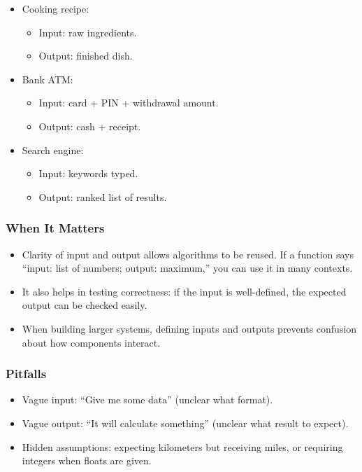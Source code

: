 \documentclass[
  letterpaper,
  DIV=11,
  numbers=noendperiod]{scrreprt}
\providecommand{\tightlist}{%
  \setlength{\itemsep}{0pt}\setlength{\parskip}{0pt}}
\begin{document}
\begin{itemize}
\item
  Cooking recipe:

  \begin{itemize}
  \tightlist
  \item
    Input: raw ingredients.
  \item
    Output: finished dish.
  \end{itemize}
\item
  Bank ATM:

  \begin{itemize}
  \tightlist
  \item
    Input: card + PIN + withdrawal amount.
  \item
    Output: cash + receipt.
  \end{itemize}
\item
  Search engine:

  \begin{itemize}
  \tightlist
  \item
    Input: keywords typed.
  \item
    Output: ranked list of results.
  \end{itemize}
\end{itemize}

\subsubsection{When It Matters}\label{when-it-matters-8}

\begin{itemize}
\tightlist
\item
  Clarity of input and output allows algorithms to be reused. If a
  function says ``input: list of numbers; output: maximum,'' you can use
  it in many contexts.
\item
  It also helps in testing correctness: if the input is well-defined,
  the expected output can be checked easily.
\item
  When building larger systems, defining inputs and outputs prevents
  confusion about how components interact.
\end{itemize}

\subsubsection{Pitfalls}\label{pitfalls-7}

\begin{itemize}
\tightlist
\item
  Vague input: ``Give me some data'' (unclear what format).
\item
  Vague output: ``It will calculate something'' (unclear what result to
  expect).
\item
  Hidden assumptions: expecting kilometers but receiving miles, or
  requiring integers when floats are given.
\end{itemize}
\end{document}
